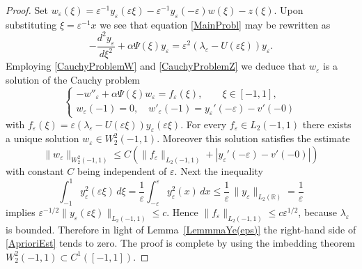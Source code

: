 \documentclass[11pt,english]{amsart}%
\begin{document}
\begin{proof}
Set $w_\varepsilon(\xi)=\varepsilon^{-1}y_\varepsilon(\varepsilon\xi)
-\varepsilon^{-1}y_\varepsilon(-\varepsilon)w(\xi)- z(\xi)$.
Upon substituting $\xi=\varepsilon^{-1}x$ we see that equation \eqref{MainProbl} may be rewritten as
\begin{equation*}
    -\frac{d^2y_\varepsilon}{d\xi^2}+\alpha\Psi(\xi)y_\varepsilon=\varepsilon^2 (\lambda_\varepsilon-U(\varepsilon\xi))y_\varepsilon.
  \end{equation*}
Employing \eqref{CauchyProblemW} and \eqref{CauchyProblemZ} we deduce that $w_\varepsilon$ is a solution of the Cauchy problem
  \begin{equation}\label{CauchyProblemWe}
    \begin{cases}
    -w''_\varepsilon+\alpha\Psi(\xi) w_\varepsilon=f_\varepsilon(\xi),\qquad \xi\in[-1,1],\\
    w_\varepsilon(-1)=0,\quad     w'_\varepsilon(-1)=y_\varepsilon'(-\varepsilon)-v'(-0)
    \end{cases}
\end{equation}
with $f_\varepsilon(\xi)=\varepsilon(\lambda_\varepsilon-U(\varepsilon\xi))y_\varepsilon(\varepsilon\xi)$. For every $f_\varepsilon\in L_2(-1,1)$ there exists a unique solution $w_\varepsilon\in W_2^2(-1,1)$. Moreover this solution satisfies the estimate
\begin{equation}\label{AprioriEst}
    \|w_\varepsilon\|_{W_2^2(-1,1)}\leq C\left(\|f_\varepsilon\|_{L_2(-1,1)}+|y_\varepsilon'(-\varepsilon)-v'(-0)|\right)
\end{equation}
with constant $C$ being independent of $\varepsilon$. Next the inequality
\begin{equation*}
    \int_{-1}^1y_\varepsilon^2(\varepsilon\xi)\,d\xi=\frac{1}{\varepsilon}\int_{-\varepsilon}^\varepsilon y_\varepsilon^2(x)\,dx\leq \frac{1}{\varepsilon}\,\|y_\varepsilon\|_{L_2(\mathbb{R})}=\frac{1}{\varepsilon}
\end{equation*}
implies $\varepsilon^{-1/2}\|y_\varepsilon(\varepsilon\xi)\|_{L_2(-1,1)}\leq c$. Hence $\|f_\varepsilon\|_{L_2(-1,1)}\leq c \varepsilon^{1/2}$, because $\lambda_\varepsilon$ is bounded.
Therefore in light of Lemma~\ref{LemmmaYe(eps)} the right-hand side of \eqref{AprioriEst} tends to zero.
The proof is complete by using the imbedding theorem $W_2^2(-1,1)\subset C^1([-1,1])$.
\end{proof}
\end{document}
